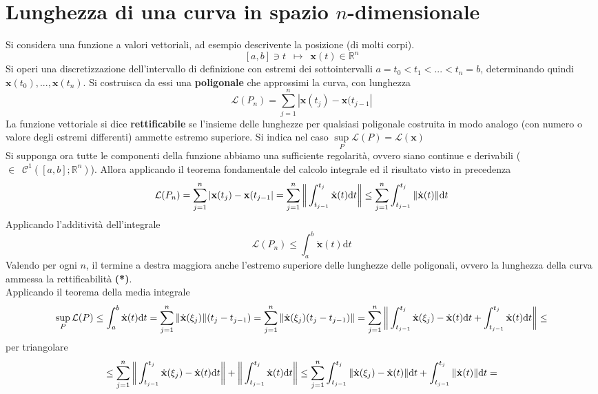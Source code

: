 \documentclass[10pt, oneside]{book}
\theoremstyle{plain}
\begin{document}
\section{Lunghezza di una curva in spazio $n$-dimensionale}
Si considera una funzione a valori vettoriali, ad esempio descrivente la posizione (di molti corpi). \[[a,b] \owns t \enspace \mapsto \enspace \mathbf{x}(t) \in \mathbb{R}^n\]
Si operi una discretizzazione dell'intervallo di definizione con estremi dei sottointervalli $a = t_0 < t_1 < ... < t_n = b$, determinando quindi $\mathbf{x}(t_0), ..., \mathbf{x}(t_n)$. Si costruisca da essi una \textbf{poligonale} che approssimi la curva, con lunghezza
\[\mathcal{L}(P_n) = \sum\limits_{j=1}^n |\mathbf{x}(t_j) - \mathbf{x}(t_{j-1}|\]
La funzione vettoriale si dice \textbf{rettificabile} se l'insieme delle lunghezze per qualsiasi poligonale costruita in modo analogo (con numero o valore degli estremi differenti) ammette estremo superiore. Si indica nel caso $\displaystyle \sup\limits_{P} \mathcal{L}(P) = \mathcal{L}(\mathbf{x})$
\\Si supponga ora tutte le componenti della funzione abbiamo una sufficiente regolarità, ovvero siano continue e derivabili ($\in \enspace \mathcal{C}^{1}([a,b] ; \mathbb{R}^n)$). Allora applicando il teorema fondamentale del calcolo integrale ed il risultato visto in precedenza
\[\mathcal{L}(P_n) = \sum\limits_{j=1}^n |\mathbf{x}(t_j) - \mathbf{x}(t_{j-1}| = \sum\limits_{j=1}^n\bigg{\|}\int_{t_{j-1}}^{t_j}\dot{\mathbf{x}}(t)\textrm{d}t\bigg{\|} \leq \sum\limits_{j=1}^n\int_{t_{j-1}}^{t_j}\|\dot{\mathbf{x}}(t)\|\textrm{d}t\]
Applicando l'additività dell'integrale
\[\mathcal{L}(P_n) \leq \int_{a}^{b}\dot{\mathbf{x}}(t)\textrm{d}t\]
Valendo per ogni $n$, il termine a destra maggiora anche l'estremo superiore delle lunghezze delle poligonali, ovvero la lunghezza della curva ammessa la rettificabilità \textbf{(*)}.
\\Applicando il teorema della media integrale
\[\sup\limits_{P}\mathcal{L}(P) \leq \int_{a}^{b}\dot{\mathbf{x}}(t)\textrm{d}t = \sum\limits_{j=1}^n\|\dot{\mathbf{x}}(\xi_j)\| (t_j - t_{j-1}) = \sum\limits_{j=1}^n\|\dot{\mathbf{x}}(\xi_j) (t_j - t_{j-1})\| = \sum\limits_{j=1}^n \bigg{\|}\int_{t_{j-1}}^{t_j}\dot{\mathbf{x}}(\xi_j) - \dot{\mathbf{x}}(t)\textrm{d}t + \int_{t_{j-1}}^{t_j}\dot{\mathbf{x}}(t)\textrm{d}t\bigg{\|} \leq\]
per triangolare
\[\leq \sum\limits_{j=1}^n \bigg{\|}\int_{t_{j-1}}^{t_j}\dot{\mathbf{x}}(\xi_j) - \dot{\mathbf{x}}(t)\textrm{d}t\bigg{\|} + \bigg{\|}\int_{t_{j-1}}^{t_j}\dot{\mathbf{x}}(t)\textrm{d}t\bigg{\|} \leq \sum\limits_{j=1}^n \int_{t_{j-1}}^{t_j}\|\dot{\mathbf{x}}(\xi_j) - \dot{\mathbf{x}}(t)\|\textrm{d}t + \int_{t_{j-1}}^{t_j}\|\dot{\mathbf{x}}(t)\|\textrm{d}t =\]
\end{document}
